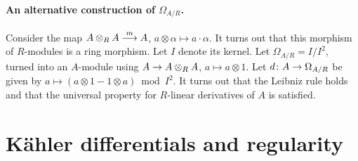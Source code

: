 \documentclass[a4paper,parskip=half,numbers=enddot, DIV=12]{scrreprt}
\begin{document}
\paragraph{An alternative construction of $\Omega_{A/R}$.} Consider the map $A\otimes_R A\morphism[m] A$, $a\otimes \alpha \mapsto a\cdot \alpha$. It turns out that this morphism of $R$-modules is a ring morphism. Let $I$ denote its kernel. Let $\Omega_{A/R} = I/I^2$, turned into an $A$-module using $A\morphism A\otimes_R A$, $a\mapsto a\otimes 1$. Let $d\colon A\morphism\Omega_{A/R}$ be given by $a\mapsto (a\otimes 1-1\otimes a)\bmod I^2$. It turns out that the Leibniz rule holds and that the universal property for $R$-linear derivatives of $A$ is satisfied.



\section{Kähler differentials and regularity}
\end{document}

